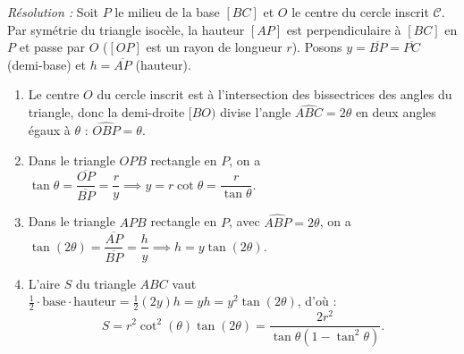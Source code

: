 \begin{exemple}
\emph{Résolution :} Soit $P$ le milieu de la base $[BC]$ et $O$ le centre du cercle inscrit $\mathcal{C}$. Par symétrie du triangle isocèle, la hauteur $[AP]$ est perpendiculaire à $[BC]$ en $P$ et passe par $O$ ($[OP]$ est un rayon de longueur $r$).
Posons $y = \overline{BP} = \overline{PC}$ (demi-base) et $h = \overline{AP}$ (hauteur).
\begin{enumerate}
    \item Le centre $O$ du cercle inscrit est à l'intersection des bissectrices des angles du triangle, donc la demi-droite $[BO)$ divise l'angle $\widehat{ABC} = 2\theta$ en deux angles égaux à $\theta$ : $\widehat{OBP} = \theta$.
    \item Dans le triangle $OPB$ rectangle en $P$, on a $\tan\theta = \dfrac{\overline{OP}}{\overline{BP}} = \dfrac{r}{y} \implies y = r\cot\theta = \dfrac{r}{\tan\theta}$.
    \item Dans le triangle $APB$ rectangle en $P$, avec $\widehat{ABP} = 2\theta$, on a $\tan(2\theta) = \dfrac{\overline{AP}}{\overline{BP}} = \dfrac{h}{y} \implies h = y\tan(2\theta)$.
    \item L'aire $S$ du triangle $ABC$ vaut $\frac{1}{2} \cdot \text{base} \cdot \text{hauteur} = \frac{1}{2}(2y)h = y h = y^2\tan(2\theta)$, d'où :
    \[
        \boxed{S = r^2\cot^2(\theta)\tan(2\theta) = \frac{2r^2}{\tan\theta(1 - \tan^2\theta)}}.
    \]
\end{enumerate}
\end{exemple}

